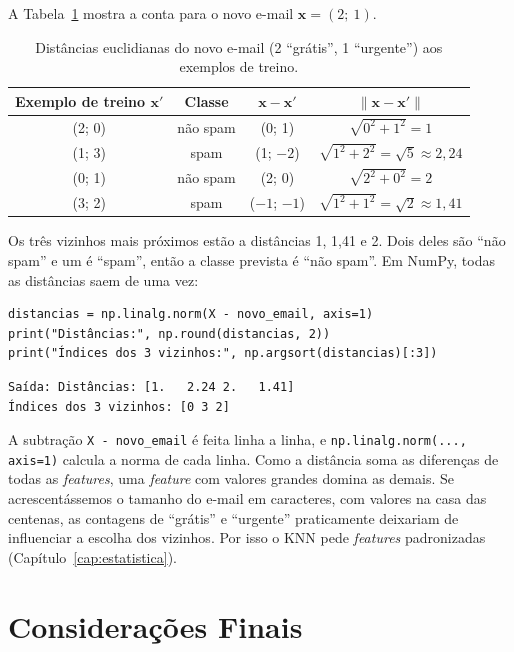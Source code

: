 \documentclass[a4paper,12pt,openany]{book}
\begin{document}
A Tabela~\ref{tab:knn_distancias} mostra a conta para o novo e-mail \(\mathbf{x} = (2;\ 1)\).

\begin{table}[H]
\centering
\begin{tabular}{cccc}
\toprule
\textbf{Exemplo de treino \(\mathbf{x}'\)} & \textbf{Classe} & \(\mathbf{x} - \mathbf{x}'\) & \(\|\mathbf{x} - \mathbf{x}'\|\) \\
\midrule
(2; 0) & não spam & (0; 1) & \(\sqrt{0^2 + 1^2} = 1\) \\
(1; 3) & spam & (1; \(-2\)) & \(\sqrt{1^2 + 2^2} = \sqrt{5} \approx 2,24\) \\
(0; 1) & não spam & (2; 0) & \(\sqrt{2^2 + 0^2} = 2\) \\
(3; 2) & spam & (\(-1\); \(-1\)) & \(\sqrt{1^2 + 1^2} = \sqrt{2} \approx 1,41\) \\
\bottomrule
\end{tabular}
\caption{Distâncias euclidianas do novo e-mail (2 ``grátis'', 1 ``urgente'') aos exemplos de treino.}
\label{tab:knn_distancias}
\end{table}

Os três vizinhos mais próximos estão a distâncias 1, 1,41 e 2. Dois deles são ``não spam'' e um é ``spam'', então a classe prevista é ``não spam''. Em NumPy, todas as distâncias saem de uma vez:

\begin{verbatim}
distancias = np.linalg.norm(X - novo_email, axis=1)
print("Distâncias:", np.round(distancias, 2))
print("Índices dos 3 vizinhos:", np.argsort(distancias)[:3])
\end{verbatim}
\begin{verbatim}
Saída: Distâncias: [1.   2.24 2.   1.41]
Índices dos 3 vizinhos: [0 3 2]
\end{verbatim}

A subtração \texttt{X - novo\_email} é feita linha a linha, e \texttt{np.linalg.norm(..., axis=1)} calcula a norma de cada linha. Como a distância soma as diferenças de todas as \textit{features}, uma \textit{feature} com valores grandes domina as demais. Se acrescentássemos o tamanho do e-mail em caracteres, com valores na casa das centenas, as contagens de ``grátis'' e ``urgente'' praticamente deixariam de influenciar a escolha dos vizinhos. Por isso o KNN pede \textit{features} padronizadas (Capítulo~\ref{cap:estatistica}).

\section{Considerações Finais}
\end{document}
